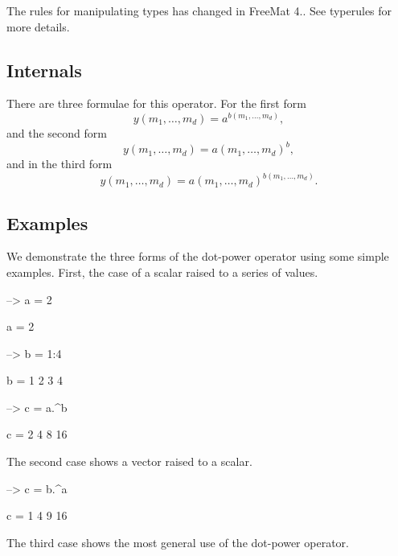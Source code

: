 The rules for manipulating types has changed in Free\-Mat 4.. See {\ttfamily typerules} for more details.\hypertarget{transforms_svd_Function}{}\subsection{Internals}\label{transforms_svd_Function}
There are three formulae for this operator. For the first form \[ y(m_1,\ldots,m_d) = a^{b(m_1,\ldots,m_d)}, \] and the second form \[ y(m_1,\ldots,m_d) = a(m_1,\ldots,m_d)^b, \] and in the third form \[ y(m_1,\ldots,m_d) = a(m_1,\ldots,m_d)^{b(m_1,\ldots,m_d)}. \] \hypertarget{variables_matrix_Examples}{}\subsection{Examples}\label{variables_matrix_Examples}
We demonstrate the three forms of the dot-\/power operator using some simple examples. First, the case of a scalar raised to a series of values.


\begin{DoxyVerbInclude}
--> a = 2

a = 
 2 

--> b = 1:4

b = 
 1 2 3 4 

--> c = a.^b

c = 
  2  4  8 16 
\end{DoxyVerbInclude}


The second case shows a vector raised to a scalar.


\begin{DoxyVerbInclude}
--> c = b.^a

c = 
  1  4  9 16 
\end{DoxyVerbInclude}


The third case shows the most general use of the dot-\/power operator.


